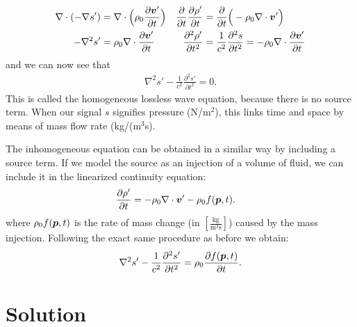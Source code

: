 \begin{align}
\nabla\cdot(-\nabla s') &= \nabla\cdot\Big(\rho_0 \frac{\partial\boldsymbol{v}'}{\partial t}\Big) &
\frac{\partial}{\partial t}\frac{\partial\rho'}{\partial t} &= \frac{\partial}{\partial t}\Big(-\rho_0\nabla \cdot \boldsymbol{v}'\Big)\nonumber\\
-\nabla^2 s' &= \rho_0 \nabla\cdot\frac{\partial\boldsymbol{v}'}{\partial t} &
\frac{\partial^2\rho'}{\partial t^2} &= \frac{1}{c^2}\frac{\partial^2 s}{\partial t^2} = -\rho_0\nabla\cdot\frac{\partial \boldsymbol{v}'}{\partial t}
\end{align}
%
and we can now see that
%
\begin{align}
\nabla^2 s' - \frac{1}{c^2}\frac{\partial^2 s'}{\partial t^2} = 0.
\end{align}
%
This is called the homogeneous lossless wave equation, because there is no source term. When our signal $s$ signifies pressure (N/m$^2$), this links time and space by means of mass flow rate (kg/(m$^3$s).

The inhomogeneous equation can be obtained in a similar way by including a source term. If we model the source as an injection of a volume of fluid, we can include it in the linearized continuity equation:
%
\begin{align}
\frac{\partial\rho'}{\partial t} &= -\rho_0\nabla \cdot \boldsymbol{v}' - \rho_0f(\boldsymbol{p},t). \label{wave_eq_mass_conservation_source}
\end{align}
%
where $\rho_0f(\boldsymbol{p},t)$ is the rate of mass change (in $\left[\frac{\text{kg}}{\text{m}^3\text{s}}\right]$) caused by the mass injection. Following the exact same procedure as before we obtain:
%
\begin{align}
\nabla^2 s' - \frac{1}{c^2}\frac{\partial^2 s'}{\partial t^2} = \rho_0\frac{\partial f(\boldsymbol{p},t)}{\partial t}.
\end{align}
%

\section{Solution}


